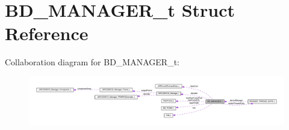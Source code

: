 \hypertarget{structBD__MANAGER__t}{}\section{B\+D\+\_\+\+M\+A\+N\+A\+G\+E\+R\+\_\+t Struct Reference}
\label{structBD__MANAGER__t}


Collaboration diagram for B\+D\+\_\+\+M\+A\+N\+A\+G\+E\+R\+\_\+t\+:
\nopagebreak
\begin{figure}[H]
\begin{center}
\leavevmode
\includegraphics[width=350pt]{structBD__MANAGER__t__coll__graph}
\end{center}
\end{figure}
